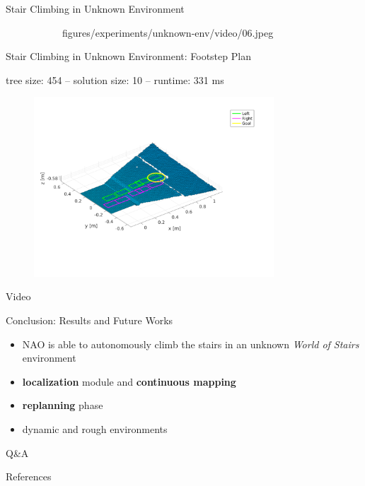 \documentclass[10pt]{beamer}
\begin{document}
\begin{frame}{Stair Climbing in Unknown Environment}
\begin{figure}
\begin{subfigure}{0.40\textwidth}
				{figures/experiments/unknown-env/video/06.jpeg}
		\end{subfigure}
	\end{figure}
\end{frame}

\begin{frame}{Stair Climbing in Unknown Environment: Footstep Plan}
	\begin{center}
    tree size: 454 -- solution size: 10 -- runtime: 331 ms
  \end{center}
	\begin{figure}
		\centering
		\includegraphics[width=0.8\textwidth]
				{figures/experiments/unknown-env/footstep-plan.pdf}
	\end{figure}
\end{frame}

\begin{frame}[standout]
  Video
\end{frame}

\begin{frame}{Conclusion: Results and Future Works}
  \begin{itemize}
		\item NAO is able to autonomously climb the stairs in an unknown
				\textit{World of Stairs} environment
		\item \textbf{localization} module and \textbf{continuous mapping}
		\item \textbf{replanning} phase
		\item dynamic and rough environments
	\end{itemize}
\end{frame}

\begin{frame}[standout]
    Q\&A
\end{frame}

\appendix

\begin{frame}{References}
  
  
\end{frame}
\end{document}
